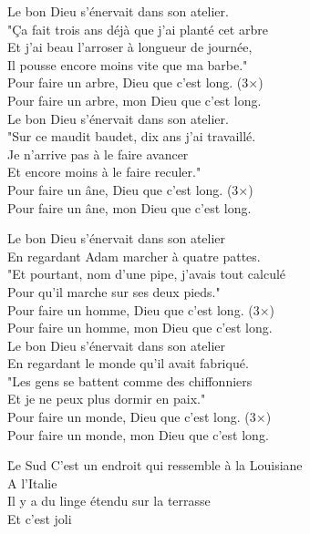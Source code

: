 \documentclass{novel}
\begin{document}
{\begin{minipage}[t][0.65\textheight][t]{\textwidth}
\begin{multicols}{2}
Le bon Dieu s'énervait dans son atelier. \\
"Ça fait trois ans déjà que j'ai planté cet arbre \\
Et j'ai beau l'arroser à longueur de journée, \\
Il pousse encore moins vite que ma barbe." \\

Pour faire un arbre, Dieu que c'est long. (3×) \\
Pour faire un arbre, mon Dieu que c'est long. \\

Le bon Dieu s'énervait dans son atelier. \\
"Sur ce maudit baudet, dix ans j'ai travaillé. \\
Je n'arrive pas à le faire avancer \\
Et encore moins à le faire reculer." \\

Pour faire un âne, Dieu que c'est long. (3×) \\
Pour faire un âne, mon Dieu que c'est long. \\
\columnbreak

Le bon Dieu s'énervait dans son atelier \\
En regardant Adam marcher à quatre pattes. \\
"Et pourtant, nom d'une pipe, j'avais tout calculé \\
Pour qu'il marche sur ses deux pieds." \\

Pour faire un homme, Dieu que c'est long. (3×) \\
Pour faire un homme, mon Dieu que c'est long. \\

Le bon Dieu s'énervait dans son atelier \\
En regardant le monde qu'il avait fabriqué. \\
"Les gens se battent comme des chiffonniers \\
Et je ne peux plus dormir en paix." \\

Pour faire un monde, Dieu que c'est long. (3×) \\
Pour faire un monde, mon Dieu que c'est long.

\end{multicols}
\end{minipage}
}

\newpage
\normalsize
\h*{Le Sud}
C'est un endroit qui ressemble à la Louisiane \\
A l'Italie \\
Il y a du linge étendu sur la terrasse \\
Et c'est joli \\
\end{document}
